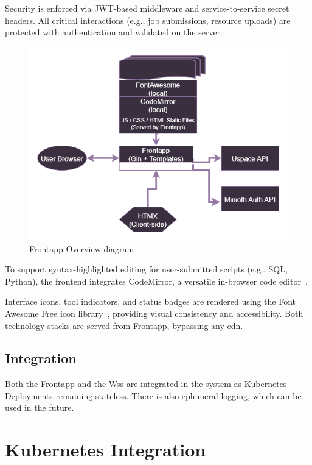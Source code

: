 Security is enforced via JWT-based middleware and service-to-service secret headers. All critical interactions (e.g., job submissions, resource uploads) are protected with authentication and validated on the server.

\begin{figure}[h!]
  \centering
  \includegraphics[width=1\textwidth]{Images/frontapp-blockdiagram.png}
  \caption{Frontapp Overview diagram}
  \label{fig:frontapp-overview}
\end{figure}

To support syntax-highlighted editing for user-submitted scripts (e.g., SQL, Python), the frontend integrates CodeMirror, a versatile in-browser code editor~\cite{codemirror}.

Interface icons, tool indicators, and status badges are rendered using the Font Awesome Free icon library~\cite{fontawesome}, providing visual consistency and accessibility.
Both technology stacks are served from Frontapp, bypassing any cdn.

\subsection{Integration}
Both the Frontapp and the Wss are integrated in the system as Kubernetes Deployments remaining stateless. There is also ephimeral logging, 
which can be used in the future.



\section{Kubernetes Integration}

